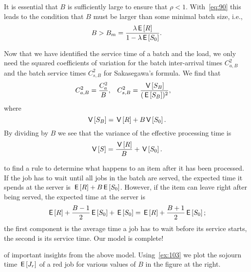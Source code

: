 It is essential that $B$ is sufficiently large to ensure that $\rho<1$.
With~\cref{eq:90} this leads to the condition that $B$ must be larger than some minimal batch size, i.e.,
\begin{equation*}
B> B_m = \frac{\lambda \,\mathsf{E}\left[R\right]}{1-\lambda \,\mathsf{E}\left[S_0\right]}.
\end{equation*}

Now that we have identified the service time of a batch and the load, we only need the squared coefficients of variation for the batch inter-arrival times $C_{a,B}^2$ and the batch service times $C_{s,B}^2$ for Sakasegawa's formula.
We find that
 \begin{align}\label{eq:82}
C_{a,B}^2 &= \frac{C_{a}^2}B, &
C_{s, B}^2 &= \frac{\,\mathsf{V}\left[S_B\right]}{(\,\mathsf{E}\left[S_B\right])^2},
\end{align}
where
\begin{equation*}
  \,\mathsf{V}\left[S_B\right] = \,\mathsf{V}\left[R\right]  + B \,\mathsf{V}\left[S_0\right].
\end{equation*}
By dividing by $B$ we see that the variance of the effective processing time is
\begin{equation}  \label{eq:107}
  \,\mathsf{V}\left[S\right] = \frac{\,\mathsf{V}\left[R\right]}{B} + \,\mathsf{V}\left[S_0\right].
\end{equation}

 to find a rule to determine what happens to an item after it has been processed.
If the job has to wait until all jobs in the batch are served, the expected time it spends at the server is $\,\mathsf{E}\left[R\right] + B \,\mathsf{E}\left[S_0\right]$.
However, if the item can leave
right after being served, the expected time at the server is
\begin{equation}\label{eq:85}
\,\mathsf{E}\left[R\right] + \frac{B-1}{2}\,\mathsf{E}\left[S_0\right] + \,\mathsf{E}\left[S_0\right]= \,\mathsf{E}\left[R\right] + \frac{B+1}{2}\,\mathsf{E}\left[S_0\right];
\end{equation}
the first component is the average time a job has to wait before its service starts, the second is its service time.
Our model is complete!



 of important insights from the above model.
Using~\cref{ex:103} we plot the sojourn time $\,\mathsf{E}\left[J_r\right]$ of a red job for various values of $B$ in the figure at the right.


